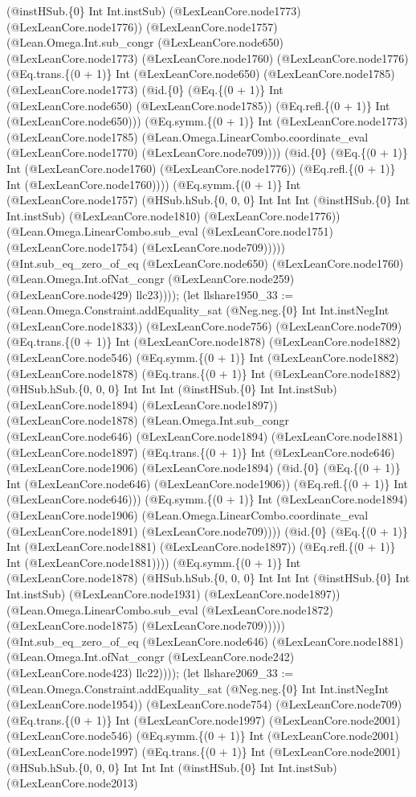 \documentclass[11pt]{article}
\begin{document}
(@instHSub.\{0\} Int Int.instSub) (@LexLeanCore.node1773) (@LexLeanCore.node1776)) (@LexLeanCore.node1757) (@Lean.Omega.Int.sub\_congr (@LexLeanCore.node650) (@LexLeanCore.node1773) (@LexLeanCore.node1760) (@LexLeanCore.node1776) (@Eq.trans.\{(0 + 1)\} Int (@LexLeanCore.node650) (@LexLeanCore.node1785) (@LexLeanCore.node1773) (@id.\{0\} (@Eq.\{(0 + 1)\} Int (@LexLeanCore.node650) (@LexLeanCore.node1785)) (@Eq.refl.\{(0 + 1)\} Int (@LexLeanCore.node650))) (@Eq.symm.\{(0 + 1)\} Int (@LexLeanCore.node1773) (@LexLeanCore.node1785) (@Lean.Omega.LinearCombo.coordinate\_eval (@LexLeanCore.node1770) (@LexLeanCore.node709)))) (@id.\{0\} (@Eq.\{(0 + 1)\} Int (@LexLeanCore.node1760) (@LexLeanCore.node1776)) (@Eq.refl.\{(0 + 1)\} Int (@LexLeanCore.node1760)))) (@Eq.symm.\{(0 + 1)\} Int (@LexLeanCore.node1757) (@HSub.hSub.\{0, 0, 0\} Int Int Int (@instHSub.\{0\} Int Int.instSub) (@LexLeanCore.node1810) (@LexLeanCore.node1776)) (@Lean.Omega.LinearCombo.sub\_eval (@LexLeanCore.node1751) (@LexLeanCore.node1754) (@LexLeanCore.node709))))) (@Int.sub\_eq\_zero\_of\_eq (@LexLeanCore.node650) (@LexLeanCore.node1760) (@Lean.Omega.Int.ofNat\_congr (@LexLeanCore.node259) (@LexLeanCore.node429) llc23)))); (let llshare1950\_33 := (@Lean.Omega.Constraint.addEquality\_sat (@Neg.neg.\{0\} Int Int.instNegInt (@LexLeanCore.node1833)) (@LexLeanCore.node756) (@LexLeanCore.node709) (@Eq.trans.\{(0 + 1)\} Int (@LexLeanCore.node1878) (@LexLeanCore.node1882) (@LexLeanCore.node546) (@Eq.symm.\{(0 + 1)\} Int (@LexLeanCore.node1882) (@LexLeanCore.node1878) (@Eq.trans.\{(0 + 1)\} Int (@LexLeanCore.node1882) (@HSub.hSub.\{0, 0, 0\} Int Int Int (@instHSub.\{0\} Int Int.instSub) (@LexLeanCore.node1894) (@LexLeanCore.node1897)) (@LexLeanCore.node1878) (@Lean.Omega.Int.sub\_congr (@LexLeanCore.node646) (@LexLeanCore.node1894) (@LexLeanCore.node1881) (@LexLeanCore.node1897) (@Eq.trans.\{(0 + 1)\} Int (@LexLeanCore.node646) (@LexLeanCore.node1906) (@LexLeanCore.node1894) (@id.\{0\} (@Eq.\{(0 + 1)\} Int (@LexLeanCore.node646) (@LexLeanCore.node1906)) (@Eq.refl.\{(0 + 1)\} Int (@LexLeanCore.node646))) (@Eq.symm.\{(0 + 1)\} Int (@LexLeanCore.node1894) (@LexLeanCore.node1906) (@Lean.Omega.LinearCombo.coordinate\_eval (@LexLeanCore.node1891) (@LexLeanCore.node709)))) (@id.\{0\} (@Eq.\{(0 + 1)\} Int (@LexLeanCore.node1881) (@LexLeanCore.node1897)) (@Eq.refl.\{(0 + 1)\} Int (@LexLeanCore.node1881)))) (@Eq.symm.\{(0 + 1)\} Int (@LexLeanCore.node1878) (@HSub.hSub.\{0, 0, 0\} Int Int Int (@instHSub.\{0\} Int Int.instSub) (@LexLeanCore.node1931) (@LexLeanCore.node1897)) (@Lean.Omega.LinearCombo.sub\_eval (@LexLeanCore.node1872) (@LexLeanCore.node1875) (@LexLeanCore.node709))))) (@Int.sub\_eq\_zero\_of\_eq (@LexLeanCore.node646) (@LexLeanCore.node1881) (@Lean.Omega.Int.ofNat\_congr (@LexLeanCore.node242) (@LexLeanCore.node423) llc22)))); (let llshare2069\_33 := (@Lean.Omega.Constraint.addEquality\_sat (@Neg.neg.\{0\} Int Int.instNegInt (@LexLeanCore.node1954)) (@LexLeanCore.node754) (@LexLeanCore.node709) (@Eq.trans.\{(0 + 1)\} Int (@LexLeanCore.node1997) (@LexLeanCore.node2001) (@LexLeanCore.node546) (@Eq.symm.\{(0 + 1)\} Int (@LexLeanCore.node2001) (@LexLeanCore.node1997) (@Eq.trans.\{(0 + 1)\} Int (@LexLeanCore.node2001) (@HSub.hSub.\{0, 0, 0\} Int Int Int (@instHSub.\{0\} Int Int.instSub) (@LexLeanCore.node2013) 
\end{document}
